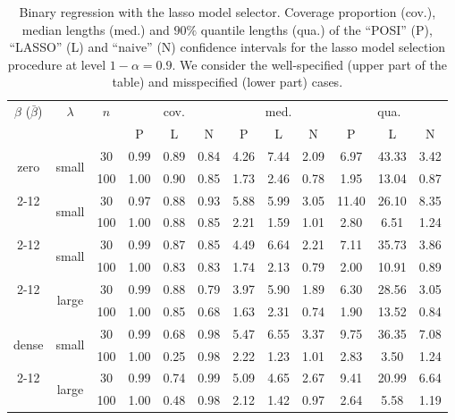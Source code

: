 \documentclass[preprint]{imsart}
\numberwithin{equation}{section}
\begin{document}
\begin{table}[tbp]
\begin{center}
\begin{tabular}{c|c|c|ccc|ccc|ccc}
 $\beta$ ($\bar{\beta}$) & $\lambda$ & $n$  & \multicolumn{3}{c}{cov.} \vline &
\multicolumn{3}{c}{med.} \vline & \multicolumn{3}{c}{qua.}  \\ 
& & & P & L &  N & P & L &  N & P & L &  N  \\ 
\hline\hline
\multirow{2}{*}{zero} & \multirow{2}{*}{small} &
30 & 0.99 & 0.89 & 0.84 & 4.26 & 7.44 & 2.09 & 6.97 & 43.33 & 3.42 \\
& & 100 & 1.00 &0.90& 0.85 &1.73& 2.46& 0.78&  1.95& 13.04& 0.87 \\ \cline{2-12}
\multirow{2}{*}{sparse} & \multirow{2}{*}{small} &
30 &0.97 & 0.88& 0.93 &5.88& 5.99& 3.05& 11.40& 26.10& 8.35  \\
& & 100 & 1.00 &0.88 &0.85& 2.21& 1.59& 1.01 & 2.80&  6.51& 1.24 \\ \cline{2-12}
\multirow{2}{*}{scaled} & \multirow{2}{*}{small} &
30 & 0.99& 0.87& 0.85 &4.49& 6.64& 2.21&  7.11& 35.73& 3.86  \\
& & 100 & 1.00& 0.83 &0.83 &1.74 &2.13& 0.79 & 2.00& 10.91& 0.89 \\ \cline{2-12}
\multirow{2}{*}{scaled} & \multirow{2}{*}{large} &
30 & 0.99& 0.88& 0.79& 3.97& 5.90& 1.89&  6.30& 28.56& 3.05  \\
& & 100 & 1.00& 0.85& 0.68& 1.63& 2.31& 0.74 & 1.90 &13.52& 0.84 \\ \hline\hline %
\multirow{2}{*}{dense} & \multirow{2}{*}{small} &
30 & 0.99& 0.68 &0.98& 5.47& 6.55& 3.37&  9.75& 36.35& 7.08  \\
& & 100 &1.00 &0.25 &0.98& 2.22& 1.23& 1.01 & 2.83 & 3.50 &1.24 \\ \cline{2-12}
\multirow{2}{*}{dense} & \multirow{2}{*}{large} &
30 & 0.99 &0.74 &0.99& 5.09& 4.65 &2.67 & 9.41& 20.99& 6.64  \\
& & 100 & 1.00 &0.48 &0.98 &2.12& 1.42& 0.97 & 2.64&  5.58 &1.19 \\
\end{tabular}%
\end{center}
\caption{Binary regression with the lasso model selector. Coverage proportion (cov.), median lengths (med.) and $90 \%$ quantile lengths (qua.) of the ``POSI'' (P), ``LASSO'' (L) and ``naive'' (N) confidence intervals for the lasso model selection procedure at level $1-\alpha=0.9$. We consider the well-specified (upper part of the table) and misspecified (lower part) cases.}
\label{table:logistic}
\end{table}
\end{document}
